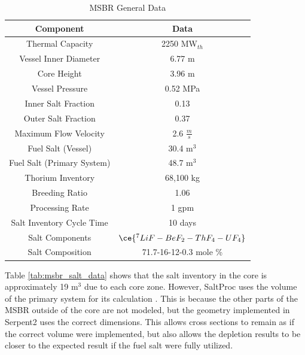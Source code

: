 \begin{table}[H]
\renewcommand{\arraystretch}{1.25}
\caption{MSBR General Data \cite{robertson_conceptual_1971}}
\label{tab:msbr_gen_data}
\begin{center}
\begin{tabular}{ | c | c | }
 \hline
 Component & Data\\
 \hline
 \hline
 Thermal Capacity & 2250 MW$_{th}$\\
 Vessel Inner Diameter & 6.77 m\\
 Core Height & 3.96 m\\
 Vessel Pressure & 0.52 MPa\\
 Inner Salt Fraction & 0.13\\
 Outer Salt Fraction & 0.37\\
 Maximum Flow Velocity & 2.6 $\frac{m}{s}$\\
 Fuel Salt (Vessel) & 30.4 m$^3$\\
 Fuel Salt (Primary System) & 48.7 m$^3$\\
 Thorium Inventory & 68,100 kg\\
 Breeding Ratio & 1.06\\
 Processing Rate & 1 gpm\\
 Salt Inventory Cycle Time & 10 days\\
 Salt Components & $\ce{^{7}LiF-BeF_{2}-ThF_{4}-UF_{4}} $\\
 Salt Composition & 71.7-16-12-0.3 mole \% \\
 \hline
\end{tabular}
\end{center}
\end{table}

Table \ref{tab:msbr_salt_data} shows that the salt inventory in the core is approximately 19 m$^3$ due to each core zone. However, SaltProc uses the volume of the primary system for its calculation \cite{rykhlevskii_modeling_2019}. This is because the other parts of the MSBR outside of the core are not modeled, but the geometry implemented in Serpent2 uses the correct dimensions. This allows cross sections to remain as if the correct volume were implemented, but also allows the depletion results to be closer to the expected result if the fuel salt were fully utilized.


